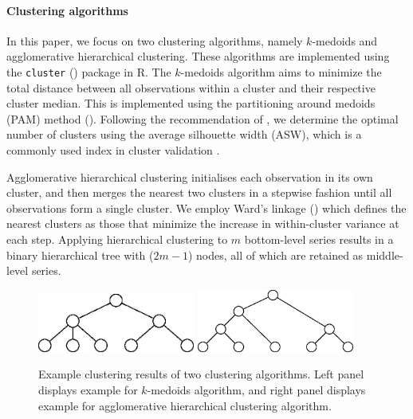 \documentclass[a4paper,review,12pt,authoryear]{elsarticle}
\begin{document}
\paragraph{\textbf{Clustering algorithms}}
In this paper, we focus on two clustering algorithms, namely $k$-medoids and agglomerative hierarchical clustering. These algorithms are implemented using the \texttt{cluster} (\citealp{cluster}) package in R. {The $k$-medoids algorithm aims to minimize the total distance between all observations within a cluster and their respective cluster median.} This is implemented using the partitioning around medoids (PAM) method (\citealp{PartitioningMedoidsProgram1990}).
Following the recommendation of \cite{PartitioningMedoidsProgram1990}, we determine the optimal number of clusters using the average silhouette width (ASW), which is a commonly used index in cluster validation \citep[see \textit{e.g.}, ][]{shutaywi2021silhouette}.

Agglomerative hierarchical clustering initialises each observation in its own cluster, and then merges the nearest two clusters in a stepwise fashion until all observations form a single cluster. We employ Ward's linkage (\citealp{murtaghWardHierarchicalAgglomerative2014a}) which defines the nearest clusters as those that minimize the increase in within-cluster variance at each step. Applying hierarchical clustering to $m$ bottom-level series results in a binary hierarchical tree with ($2m-1$) nodes, all of which are retained as middle-level series. 

\begin{figure}[!h]
    \centering
    \includegraphics[width=0.46\textwidth]{../figures/Figure1_left.jpg}
    \hspace{1cm}
    \includegraphics[width=0.46\textwidth]{../figures/Figure1_right.jpg}
    \caption{\label{fig:cluster_example}Example clustering results of two clustering algorithms. Left panel displays example for $k$-medoids algorithm, and right panel displays example for agglomerative hierarchical clustering algorithm.}
\end{figure}
\end{document}
